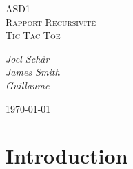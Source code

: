 \documentclass[a4paper]{article} %
\begin{document}
	
	\begin{titlepage}
		\centering
		
		\vspace{5cm}
		
		{\scshape\LARGE \color{Monokaimagenta} ASD1 \\ Rapport Recursivité \\Tic Tac Toe \par}
		
		\vspace{1cm}
		\vfill

		
		{\Large\itshape Joel Schär \\
			James Smith\\
			Guillaume \par}
		\vspace{4cm}
		\vfill
		
		
		{\large \today\par}
		
	\end{titlepage}

\phantom{}
\section*{Introduction}
	
\end{document}
